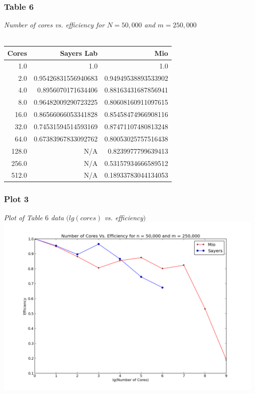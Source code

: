 \documentclass[letterpaper, 12pt]{article}
\begin{document}
	\subsubsection*{Table 6} \small\textit{Number of cores vs. efficiency for $N=50,000$ and $m=250,000$} \\\\
	\normalsize
	\begin{tabular}{r||r|r}
	\hline
		Cores              &Sayers Lab                     &Mio \\ 
	\hline
		  1.0                     &1.0                     &1.0 \\ 
		  2.0     &0.95426831556940683     &0.94949538893533902 \\ 
		  4.0      &0.8956070171634406     &0.88163431687856941 \\ 
		  8.0     &0.96482009290723225     &0.80608160911097615 \\ 
		 16.0     &0.86566066053341828     &0.85458474966908116 \\ 
		 32.0     &0.74531594514593169     &0.87471107480813248 \\ 
		 64.0     &0.67383967833092762     &0.80053025757516438 \\ 
		128.0                     &N/A      &0.8239977799639413 \\ 
		256.0                     &N/A     &0.53157934666589512 \\ 
		512.0                     &N/A     &0.18933783044134053 \\ 
		\hline
	\end{tabular}
	
	\subsubsection*{Plot 3} \small\textit{Plot of Table $6$ data $(lg(cores)$ vs. efficiency$)$} \\
	\normalsize
	\includegraphics[width=.75\linewidth]{ProjectFiles/results/plots/coresVefficiency.png}
	
\end{document}
